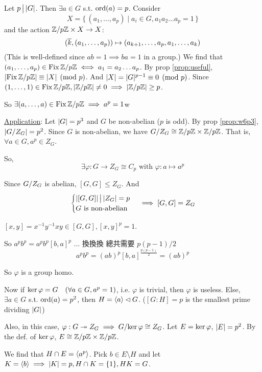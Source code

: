 \begin{theorem}
  Let $p \Div \abs{G}$. Then $\exists a \in G$ s.t. $\ord(a) = p$. Consider 
  \[ X = \{\, (a_1, \dots, a_p) \mid a_i \in G, a_1a_2\dots a_p = 1\,\} \]
  and the action $\quot{\Zb}{p\Zb} \times X \to X$:
  \[
    (\ob{k}, (a_1, \dots, a_p)) \mapsto (a_{k+1}, \dots, a_p, a_1, \dots, a_k)
  \]
  (This is well-defined since $ab = 1 \implies ba = 1$ in a group.)
  We find that $(a_1, \dots, a_p) \in \Fix \quot{\Zb}{p\Zb} \iff a_1 = a_2
  \dots a_p$.
  By prop \ref{prop:useful}, $\abs*{\Fix \quot{\Zb}{p\Zb}} \equiv \abs{X}
  \pmod p$. And $\abs{X} = \abs{G}^{p-1} \equiv 0 \pmod p$.
  Since $(1, \dots, 1) \in \Fix \quot{\Zb}{p\Zb}, \abs*{\quot{\Zb}{p\Zb}} \ne 0
  \implies \abs*{\quot{\Zb}{p\Zb}} \ge p$.

  So $\exists (a, \dots, a) \in \Fix \quot{\Zb}{p\Zb} \implies a^p = 1$w
\end{theorem}

\underline{Application}: Let $\abs{G} = p^3$ and $G$ be non-abelian
($p$ is odd).
By prop \ref{prop:w6p3}, $\abs*{\quot{G}{Z_G}} = p^2$. Since $G$ is non-abelian,
we have $\quot{G}{Z_G} \cong \quot{\Zb}{p\Zb} \times \quot{\Zb}{p\Zb}$.
That is, $\forall a \in G, a^p \in Z_G$.

So,
\[
  \exists \varphi: G \to Z_G \cong C_p \text{~with~}
  \varphi: a \mapsto a^p
\]

Since $\quot{G}{Z_G}$ is abelian, $[G,G] \le Z_G$. And
\[
  \begin{cases}
    \abs{[G,G]} \Div \abs{Z_G} = p \\
    G \text{~is non-abelian}
  \end{cases}
  \implies [G,G] = Z_G
\]

\begin{definition}
  $[x, y] = x^{-1}y^{-1}xy \in [G,G], [x,y]^p = 1$.
\end{definition}

So $a^p b^p = a^p b^p [b, a]^p$ ... 換換換 總共需要 $p(p-1)/2$
\[ a^p b^p = (ab)^p [b,a]^{\frac{p(p-1)}{2}} = (ab)^p \]

So $\varphi$ is a group homo.

Now if $\Ker \varphi = G \quad (\forall a \in G, a^p = 1)$,
i.e. $\varphi$ is trivial, then $\varphi$ is useless. 
Else, $\exists a \in G$ s.t. $\ord(a) = p^2$, then
$H = \gen{a} \lhd G$. ($[G:H] = p$ is the smallest prime dividing $\abs{G}$)

Also, in this case, $\varphi: G \onto Z_G \implies 
\quot{G}{\Ker \varphi} \cong Z_G$. Let $E = \Ker \varphi$, $\abs{E} = p^2$.
By the def. of $\Ker \varphi$, $E \cong \quot{\Zb}{p\Zb} \times
\quot{\Zb}{p\Zb}$.

We find that $H \cap E = \gen{a^p}$. Pick $b \in E \setminus H$ and let
$K = \gen{b} \implies \abs{K} = p, H \cap K = \{ 1 \}, HK = G$.
